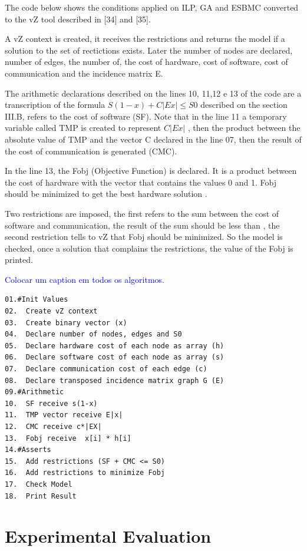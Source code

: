 The code below shows the conditions applied on ILP, GA and ESBMC converted to the vZ tool described in [34] and [35]. 

A vZ context is created, it receives the restrictions and returns the model if a solution to the set of rectictions exists. Later the number of nodes are declared, number of edges, the number of, the cost of hardware, cost of software, cost of communication and the incidence matrix E.

The arithmetic declarations described on the lines 10, 11,12 e 13 of the code are a transcription of the formula $ S(1-x) + C|Ex| \leq S{0} $ described on the section III.B, refers to the cost of software (SF). Note that in the line 11 a temporary variable called TMP is created to represent $C|Ex|$  , then the product between the absolute value of TMP and the vector C declared in the line 07, then the result of the cost of communication is generated (CMC). 

In the line 13, the Fobj (Objective Function) is declared. It is a product between the cost of hardware with the vector that contains the values 0 and 1. Fobj should be minimized to get the best hardware solution .

Two restrictions are imposed, the first refers to the sum between the cost of software and communication, the result of the sum should be less than , the second restriction tells to vZ that Fobj should be minimized. So the model is checked, once a solution that complains the restrictions, the value of the Fobj is printed.

\textcolor{blue}{Colocar um caption em todos os algoritmos.}

\begin{lstlisting}[caption=Pseudocode describing vZ]
01.#Init Values
02.  Create vZ context 
03.  Create binary vector (x)
04.  Declare number of nodes, edges and S0
05.  Declare hardware cost of each node as array (h) 
06.  Declare software cost of each node as array (s)
07.  Declare communication cost of each edge (c)
08.  Declare transposed incidence matrix graph G (E)
09.#Arithmetic
10.  SF receive s(1-x)
11.  TMP vector receive E|x| 
12.  CMC receive c*|EX|
13.  Fobj receive  x[i] * h[i]
14.#Asserts
15.  Add restrictions (SF + CMC <= S0)
16.  Add restrictions to minimize Fobj
17.  Check Model
18.  Print Result
\end{lstlisting}


\section{Experimental Evaluation}

